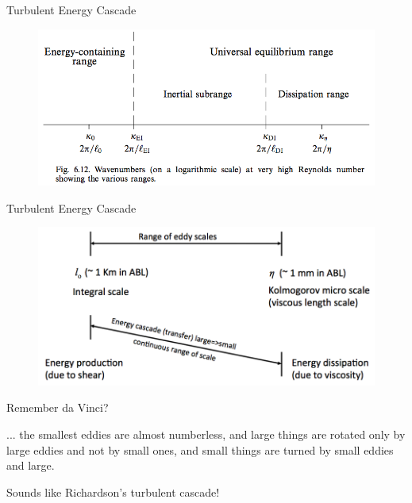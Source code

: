 \begin{frame}{Turbulent Energy Cascade}
\begin{figure}
	\includegraphics[width=1\textwidth]{turb1.png}
\end{figure}
\end{frame}

\begin{frame}{Turbulent Energy Cascade}
\begin{figure}
	\includegraphics[width=1\textwidth]{scales2.png}
\end{figure}
\end{frame}


\begin{frame}{Remember da Vinci?}
  \setlength{\fboxsep}{0pt}
  \setlength{\fboxrule}{1pt}
  \begin{figure}[H]
  \centering
  \end{figure}
  
      \begin{fancyquotes}
      ... the smallest eddies are almost numberless, and large things are rotated only by large eddies and not by small ones, and small things are turned by small eddies and large.	
      \end{fancyquotes}
Sounds like Richardson's turbulent cascade!
\end{frame}

